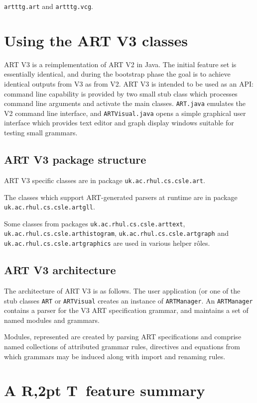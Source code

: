 \documentclass[11pt]{article}
\newcommand{\art}{{\rm A\kern -2pt R\kern -2,2pt T}}
\begin{document}
 {\tt artttg.art} and {\tt artttg.vcg}.

\section{Using the ART V3 classes}

ART V3 is a reimplementation of ART V2 in Java. The initial feature set is essentially identical, and during the bootstrap phase the goal is to achieve identical outputs from V3 as from V2. ART V3 is intended to be used as an API: command line capability is provided by two small stub class which processes command line arguments and activate the main classes. {\tt ART.java} emulates the V2 command line interface, and {\tt ARTVisual.java} opens a simple graphical user interface which provides text editor and graph display windows suitable for testing small grammars.

\subsection{ART V3 package structure}

ART V3 specific classes are in package {\tt uk.ac.rhul.cs.csle.art}.

The classes which support ART-generated parsers at runtime are in package {\tt uk.ac.rhul.cs.csle.artgll}.

Some classes from packages {\tt uk.ac.rhul.cs.csle.arttext}, {\tt uk.ac.rhul.cs.csle.arthistogram}, {\tt uk.ac.rhul.cs.csle.artgraph} and {\tt uk.ac.rhul.cs.csle.artgraphics} are used in various helper r\^oles.

\subsection{ART V3 architecture}
The architecture of ART V3 is as follows. The user application (or one of the stub classes {\tt ART} or {\tt ARTVisual} creates an instance of {\tt ARTManager}. An {\tt ARTManager} contains a parser for the V3 ART specification grammar, and maintains a set of named modules and grammars. 

Modules, represented  are created by parsing ART specifications and comprise named collections of attributed grammar rules, directives and equations from which grammars may be induced along with import and renaming rules. 


\section{\art\ feature summary}
\end{document}
